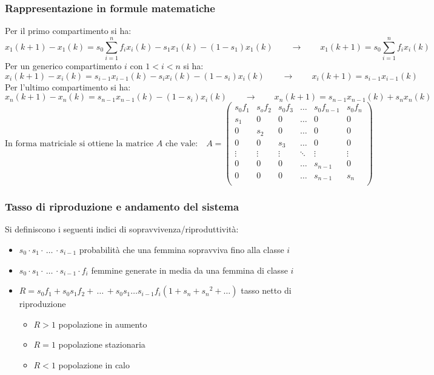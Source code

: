 \subsubsection*{Rappresentazione in formule matematiche}
Per il primo compartimento si ha:
\[x_1(k+1) - x_1(k) = s_0 \sum_{i=1}^{n} f_i x_i(k) - s_1 x_1(k) - (1-s_1) x_1(k) \qquad \rightarrow \qquad x_1(k+1) = s_0 \sum_{i=1}^{n} f_i x_i(k)\]
Per un generico compartimento \(i\) con \(1 < i < n\) si ha:
\[x_i(k+1) - x_i(k) = s_{i-1} x_{i-1}(k) - s_i x_i(k) - (1-s_i)x_i(k) \qquad \rightarrow \qquad x_i(k+1) = s_{i-1} x_{i-1}(k)\]
Per l'ultimo compartimento si ha:
\[x_n(k+1) - x_n(k) = s_{n-1} x_{n-1}(k) - (1-s_i)x_i(k) \qquad \rightarrow \qquad x_n(k+1) = s_{n-1} x_{n-1}(k) + s_n x_n(k)\]
\[\text{In forma matriciale si ottiene la matrice \(A\) che vale:} \quad A = \left(\begin{matrix}
	s_0 f_1 & s_o f_2 & s_0 f_3 & \dots & s_0 f_{n-1} & s_0 f_n \\
	s_1 & 0 & 0 & \dots & 0 & 0 \\
	0 & s_2 & 0 & \dots & 0 & 0 \\
	0 & 0 & s_3 & \dots & 0 & 0 \\
	\vdots & \vdots & \vdots & \ddots & \vdots & \vdots \\
	0 & 0 & 0 & \dots & s_{n-1} & 0 \\
	0 & 0 & 0 & \dots & s_{n-1} & s_n \\
\end{matrix}\right)\quad\]

\subsubsection*{Tasso di riproduzione e andamento del sistema}
Si definiscono i seguenti indici di sopravvivenza/riproduttività:
\begin{itemize}
	\item \(s_0 \cdot s_1 \cdot \!\, \dots \!\, \cdot s_{i-1}\) probabilità che una femmina sopravviva fino alla classe \(i\)
	\item \(s_0 \cdot s_1 \cdot \!\, \dots \!\, \cdot s_{i-1} \cdot f_i\) femmine generate in media da una femmina di classe \(i\)
	\item \(R = s_0 f_1 + s_0 s_1 f_2 + \!\, \dots \!\, + s_0 s_1 \dots s_{i-1} f_i (1 + s_n + {s_n}^2 + \dots)\) tasso netto di riproduzione
	\begin{itemize}
		\item \(R > 1\) popolazione in aumento
		\item \(R = 1\) popolazione stazionaria
		\item \(R < 1\) popolazione in calo
	\end{itemize}
\end{itemize}

